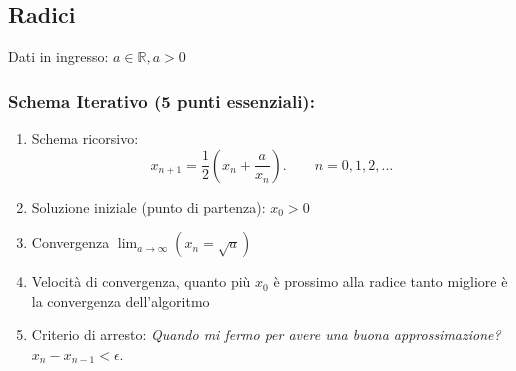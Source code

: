 \subsection{Radici}
Dati in ingresso: $a\in\mathbb{R}, a > 0$
\newline
\subsubsection{Schema Iterativo (5 punti essenziali):}
\begin{enumerate}
    \item Schema ricorsivo: 
    \begin{displaymath}
        x_{n+1} = \frac{1}{2}(x_n + \frac{a}{x_n}). \qquad n = 0, 1, 2, ...
    \end{displaymath}
    \item Soluzione iniziale (punto di partenza): $x_0 > 0$
    \item Convergenza $\lim_{a \rightarrow \infty}(x_n = \sqrt{a})$
    \item Velocità di convergenza, quanto più $x_0$ è prossimo alla radice tanto migliore è la convergenza dell'algoritmo
    \item Criterio di arresto: \textit{Quando mi fermo per avere una buona approssimazione?} $x_n - x_{n-1} < \epsilon$.
\end{enumerate}
